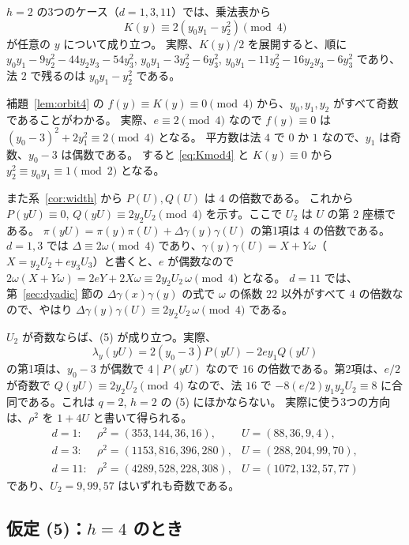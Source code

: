 \documentclass[a4paper,11pt]{ltjsarticle}
\theoremstyle{jplain}
\numberwithin{equation}{section}
\numberwithin{table}{section}
\newcommand{\tsec}[2]{\texorpdfstring{#1}{#2}}
\begin{document}
$h=2$ の3つのケース（$d=1,3,11$）では、乗法表から
\begin{equation}\label{eq:Kmod4}
K(y)\equiv2(y_0y_1-y_2^2)\pmod4
\end{equation}
が任意の $y$ について成り立つ。
実際、$K(y)/2$ を展開すると、順に $y_0y_1-9y_2^2-44y_2y_3-54y_3^2$, $y_0y_1-3y_2^2-6y_3^2$, $y_0y_1-11y_2^2-16y_2y_3-6y_3^2$ であり、法 $2$ で残るのは $y_0y_1-y_2^2$ である。

補題~\ref{lem:orbit4} の $f(y)\equiv K(y)\equiv0\pmod4$ から、$y_0,y_1,y_2$ がすべて奇数であることがわかる。
実際、$e\equiv2\pmod4$ なので $f(y)\equiv0$ は $(y_0-3)^2+2y_1^2\equiv2\pmod4$ となる。
平方数は法 $4$ で $0$ か $1$ なので、$y_1$ は奇数、$y_0-3$ は偶数である。
すると \eqref{eq:Kmod4} と $K(y)\equiv0$ から $y_2^2\equiv y_0y_1\equiv1\pmod2$ となる。

また系~\ref{cor:width} から $P(U),Q(U)$ は $4$ の倍数である。
これから $P(yU)\equiv0$, $Q(yU)\equiv2y_2U_2\pmod4$ を示す。ここで $U_2$ は $U$ の第 $2$ 座標である。
$\pi(yU)=\pi(y)\pi(U)+\Delta\gamma(y)\gamma(U)$ の第1項は $4$ の倍数である。
$d=1,3$ では $\Delta\equiv2\omega\pmod4$ であり、$\gamma(y)\gamma(U)=X+Y\omega$（$X=y_2U_2+ey_3U_3$）と書くと、$e$ が偶数なので $2\omega(X+Y\omega)=2eY+2X\omega\equiv2y_2U_2\,\omega\pmod4$ となる。
$d=11$ では、第~\ref{sec:dyadic} 節の $\Delta\gamma(x)\gamma(y)$ の式で $\omega$ の係数 $22$ 以外がすべて $4$ の倍数なので、やはり $\Delta\gamma(y)\gamma(U)\equiv2y_2U_2\,\omega\pmod4$ である。

$U_2$ が奇数ならば、(5) が成り立つ。実際、
\[
\lambda_y(yU)=2(y_0-3)P(yU)-2ey_1Q(yU)
\]
の第1項は、$y_0-3$ が偶数で $4\mid P(yU)$ なので $16$ の倍数である。第2項は、$e/2$ が奇数で $Q(yU)\equiv2y_2U_2\pmod4$ なので、法 $16$ で $-8(e/2)y_1y_2U_2\equiv8$ に合同である。これは $q=2$, $h=2$ の (5) にほかならない。
実際に使う3つの方向は、$\rho^2$ を $1+4U$ と書いて得られる。
\[
\begin{array}{lll}
d=1: & \rho^2=(353,144,36,16), & U=(88,36,9,4),\\
d=3: & \rho^2=(1153,816,396,280), & U=(288,204,99,70),\\
d=11: & \rho^2=(4289,528,228,308), & U=(1072,132,57,77)
\end{array}
\]
であり、$U_2=9,99,57$ はいずれも奇数である。

\subsection{仮定 (5)：\tsec{$h=4$}{h=4} のとき}\label{sec:hyp5b}
\end{document}
